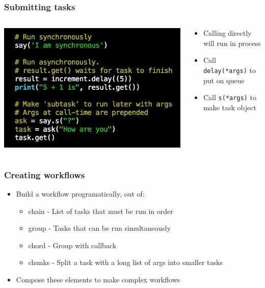 \documentclass{beamer}
\begin{document}
\begin{frame}
  \frametitle{Submitting tasks}
  \begin{columns}
    \begin{column}{0.55\textwidth}

      \includegraphics[scale=0.3]{runtasks.png}

    \end{column}
    \begin{column}{0.45\textwidth}
      \begin{itemize}
      \item Calling directly will run in process
      \item Call {\tt delay(*args)} to put on queue
      \item Call {\tt s(*args)} to make task object
      \end{itemize}
    \end{column}
  \end{columns}
\end{frame}


\begin{frame}
  \frametitle{Creating workflows}
  \begin{Large}
  \begin{itemize}
  \item Build a workflow programatically, out of:
    \begin{itemize}
  \item chain - List of tasks that must be run in order
  \item group - Tasks that can be run simultaneously
  \item chord - Group with callback
  \item chunks - Split a task with a long list of args into smaller tasks
    \end{itemize}
    \item Compose these elements to make complex workflows
  \end{itemize}
    
  \end{Large}

\end{frame}
\end{document}
